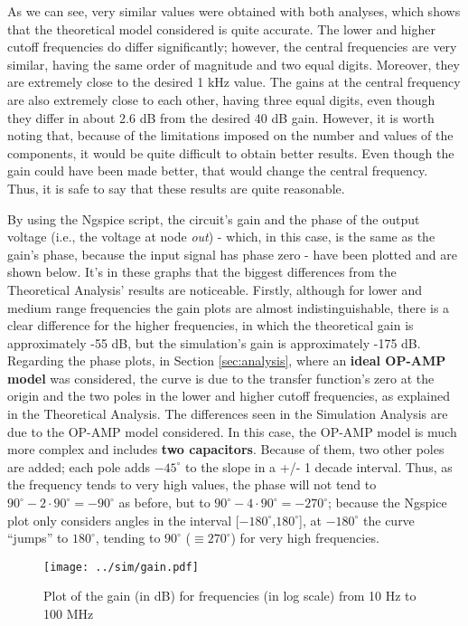 As we can see, very similar values were obtained with both analyses, which shows that the theoretical model considered is quite accurate. The lower and higher cutoff frequencies do differ significantly; however, the central frequencies are very similar, having the same order of magnitude and two equal digits. Moreover, they are extremely close to the desired 1 kHz value. The gains at the central frequency are also extremely close to each other, having three equal digits, even though they differ in about 2.6 dB from the desired 40 dB gain. However, it is worth noting that, because of the limitations imposed on the number and values of the components, it would be quite difficult to obtain better results. Even though the gain could have been made better, that would change the central frequency. Thus, it is safe to say that these results are quite reasonable.
\par
By using the Ngspice script, the circuit's gain and the phase of the output voltage (i.e., the voltage at node \textit{out}) - which, in this case, is the same as the gain's phase, because the input signal has phase zero - have been plotted and are shown below. It's in these graphs that the biggest differences from the Theoretical Analysis' results are noticeable. Firstly, although for lower and medium range frequencies the gain plots are almost indistinguishable, there is a clear difference for the higher frequencies, in which the theoretical gain is approximately -55 dB, but the simulation's gain is approximately -175 dB. Regarding the phase plots, in Section \ref{sec:analysis}, where an \textbf{ideal OP-AMP model} was considered, the curve is due to the transfer function's zero at the origin and the two poles in the lower and higher cutoff frequencies, as explained in the Theoretical Analysis. The differences seen in the Simulation Analysis are due to the OP-AMP model considered. In this case, the OP-AMP model is much more complex and includes \textbf{two capacitors}. Because of them, two other poles are added; each pole adds $-45^{\circ}$ to the slope in a +/- 1 decade interval. Thus, as the frequency tends to very high values, the phase will not tend to $90^{\circ}-2\cdot90^{\circ}=-90^{\circ}$ as before, but to $90^{\circ}-4\cdot90^{\circ}=-270^{\circ}$; because the Ngspice plot only considers angles in the interval [$-180^{\circ}$,$180^{\circ}$], at $-180^{\circ}$ the curve ``jumps'' to $180^{\circ}$, tending to $90^{\circ}$ ($\equiv 270^{\circ}$) for very high frequencies.

\begin{figure}[H] \centering
  \texttt{[image: ../sim/gain.pdf]}
  \caption{Plot of the gain (in dB) for frequencies (in log scale) from 10 Hz to 100 MHz}
  \label{fig:gain_simulation}
\end{figure}

